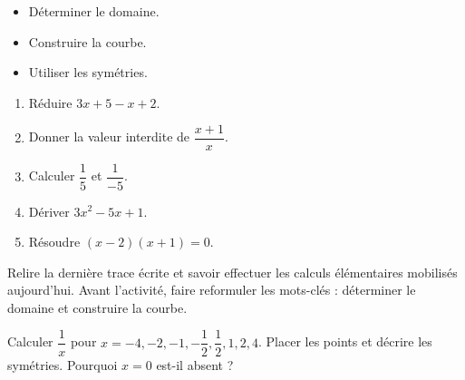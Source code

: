 \begin{objectifs}\begin{itemize}\item Déterminer le domaine.\item Construire la courbe.\item Utiliser les symétries.\end{itemize}\end{objectifs}
\begin{automatismes}\begin{enumerate}\item Réduire $3x+5-x+2$. \item Donner la valeur interdite de $\dfrac{x+1}{x}$. \item Calculer $\dfrac1{5}$ et $\dfrac1{-5}$. \item Dériver $3x^2-5x+1$. \item Résoudre $(x-2)(x+1)=0$. \end{enumerate}\end{automatismes}
\begin{prerequis}Relire la dernière trace écrite et savoir effectuer les calculs élémentaires mobilisés aujourd'hui. Avant l'activité, faire reformuler les mots-clés : déterminer le domaine et construire la courbe.\end{prerequis}

\begin{activite}
Calculer $\dfrac1x$ pour $x=-4,-2,-1,-\dfrac12,\dfrac12,1,2,4$. Placer les points et décrire les symétries. Pourquoi $x=0$ est-il absent ?
\begin{center}\end{center}
\end{activite}


